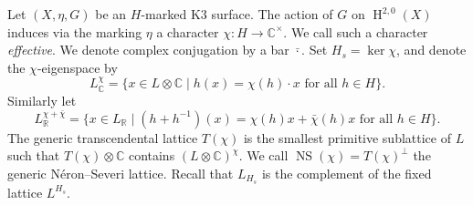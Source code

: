\documentclass[a4paper]{amsart}
\theoremstyle{definition}
\theoremstyle{plain}
\DeclareMathOperator{\NS}{NS}
\DeclareMathOperator{\HH}{H}
\newcommand{\RR}{\mathbb{R}}
\newcommand{\CC}{\mathbb{C}}
\begin{document}
Let $(X,\eta,G)$ be an $H$-marked K3 surface. The action of $G$ on $\HH^{2,0}(X)$ induces via the marking $\eta$ a character $\chi\colon H \rightarrow \CC^\times$. We call such a character \emph{effective}. We denote complex conjugation by a bar $\bar\cdot$.
Set $H_s = \ker \chi$, and denote the $\chi$-eigenspace by
\[L_\CC^\chi = \{x \in L \otimes \CC \mid h(x) = \chi(h)\cdot x  \mbox{ for all }h \in H\}.\]
 Similarly let
\[L_\RR^{\chi+\bar\chi}=\{x \in L_\RR \mid (h+h^{-1})(x) = \chi(h)x+\bar \chi(h)x \text{ for all } h \in H\}.\]
The generic transcendental lattice $T(\chi)$ is the smallest primitive sublattice of $L$ such that $T(\chi) \otimes \CC$ contains $(L\otimes \CC)^\chi$. We call
$\NS(\chi) = T(\chi)^\perp$ the generic N\'eron--Severi lattice.
Recall that $L_{H_s}$ is the complement of the fixed lattice $L^{H_s}$.
\end{document}
